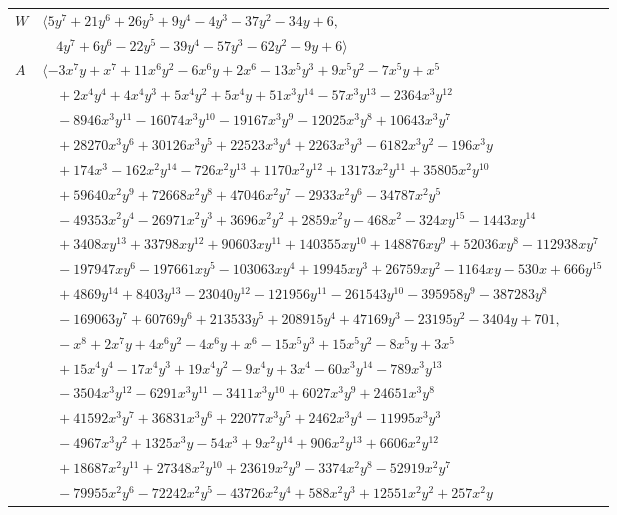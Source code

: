 \documentclass[11pt]{article}
\begin{document}
\begin{longtable}{@{}ll@{}}
$W$ & $\langle 5y^{7}+21y^{6}+26y^{5}+9y^{4}-4y^{3}-37y^{2}-34y+6,$\\
 & $\quad 4y^{7}+6y^{6}-22y^{5}-39y^{4}-57y^{3}-62y^{2}-9y+6\rangle$\\
$A$ & $\langle -3x^{7}y+x^{7}+11x^{6}y^{2}-6x^{6}y+2x^{6}-13x^{5}y^{3}+9x^{5}y^{2}-7x^{5}y+x^{5}$\\
 & $\quad +2x^{4}y^{4}+4x^{4}y^{3}+5x^{4}y^{2}+5x^{4}y+51x^{3}y^{14}-57x^{3}y^{13}-2364x^{3}y^{12}$\\
 & $\quad -8946x^{3}y^{11}-16074x^{3}y^{10}-19167x^{3}y^{9}-12025x^{3}y^{8}+10643x^{3}y^{7}$\\
 & $\quad +28270x^{3}y^{6}+30126x^{3}y^{5}+22523x^{3}y^{4}+2263x^{3}y^{3}-6182x^{3}y^{2}-196x^{3}y$\\
 & $\quad +174x^{3}-162x^{2}y^{14}-726x^{2}y^{13}+1170x^{2}y^{12}+13173x^{2}y^{11}+35805x^{2}y^{10}$\\
 & $\quad +59640x^{2}y^{9}+72668x^{2}y^{8}+47046x^{2}y^{7}-2933x^{2}y^{6}-34787x^{2}y^{5}$\\
 & $\quad -49353x^{2}y^{4}-26971x^{2}y^{3}+3696x^{2}y^{2}+2859x^{2}y-468x^{2}-324xy^{15}-1443xy^{14}$\\
 & $\quad +3408xy^{13}+33798xy^{12}+90603xy^{11}+140355xy^{10}+148876xy^{9}+52036xy^{8}-112938xy^{7}$\\
 & $\quad -197947xy^{6}-197661xy^{5}-103063xy^{4}+19945xy^{3}+26759xy^{2}-1164xy-530x+666y^{15}$\\
 & $\quad +4869y^{14}+8403y^{13}-23040y^{12}-121956y^{11}-261543y^{10}-395958y^{9}-387283y^{8}$\\
 & $\quad -169063y^{7}+60769y^{6}+213533y^{5}+208915y^{4}+47169y^{3}-23195y^{2}-3404y+701,$\\
 & $\quad -x^{8}+2x^{7}y+4x^{6}y^{2}-4x^{6}y+x^{6}-15x^{5}y^{3}+15x^{5}y^{2}-8x^{5}y+3x^{5}$\\
 & $\quad +15x^{4}y^{4}-17x^{4}y^{3}+19x^{4}y^{2}-9x^{4}y+3x^{4}-60x^{3}y^{14}-789x^{3}y^{13}$\\
 & $\quad -3504x^{3}y^{12}-6291x^{3}y^{11}-3411x^{3}y^{10}+6027x^{3}y^{9}+24651x^{3}y^{8}$\\
 & $\quad +41592x^{3}y^{7}+36831x^{3}y^{6}+22077x^{3}y^{5}+2462x^{3}y^{4}-11995x^{3}y^{3}$\\
 & $\quad -4967x^{3}y^{2}+1325x^{3}y-54x^{3}+9x^{2}y^{14}+906x^{2}y^{13}+6606x^{2}y^{12}$\\
 & $\quad +18687x^{2}y^{11}+27348x^{2}y^{10}+23619x^{2}y^{9}-3374x^{2}y^{8}-52919x^{2}y^{7}$\\
 & $\quad -79955x^{2}y^{6}-72242x^{2}y^{5}-43726x^{2}y^{4}+588x^{2}y^{3}+12551x^{2}y^{2}+257x^{2}y$\\

\end{longtable}
\end{document}
